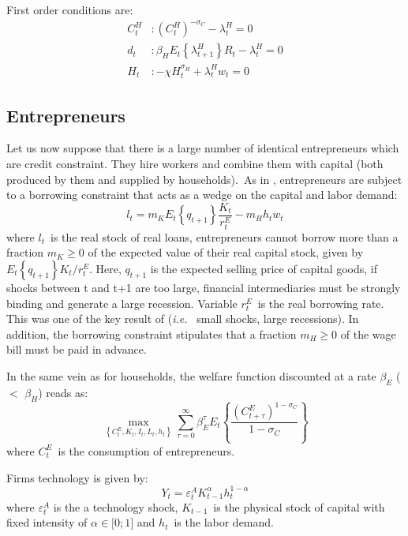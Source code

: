 \documentclass[a4paper,12pt]{article}%
\begin{document}
First order conditions are:%
\begin{align}
C_{t}^{H}  &  :\left(  C_{t}^{H}\right)  ^{-\sigma_{C}}-\lambda_{t}^{H}=0\\
d_{t}  &  :\beta_{H}E_{t}\left\{  \lambda_{t+1}^{H}\right\}  R_{t}-\lambda
_{t}^{H}=0\\
H_{t}  &  :-\chi H_{t}^{\sigma_{H}}+\lambda_{t}^{H}w_{t}=0
\end{align}


\subsection{Entrepreneurs}

Let us now suppose that there is a large number of identical entrepreneurs
which are credit constraint. They hire workers and combine them with capital
(both produced by them and supplied by households).\ As in
\cite{iacoviello2015financial}, entrepreneurs are subject to a borrowing
constraint that acts as a wedge on the capital and labor demand:
\begin{equation}
l_{t}=m_{K}E_{t}\left\{  q_{t+1}\right\}  \frac{K_{t}}{r_{t}^{E}}-m_{H}%
h_{t}w_{t}%
\end{equation}
where $l_{t}$\ is the real stock of real loans, entrepreneurs cannot borrow
more than a fraction $m_{K}\geq0$ of the expected value of their real capital
stock, given by $E_{t}\left\{  q_{t+1}\right\}  K_{t}/r_{t}^{E}$. Here,
$q_{t+1}$ is the expected selling price of capital goods, if shocks between t
and t+1 are too large, financial intermediaries must be strongly binding and
generate a large recession. Variable $r_{t}^{E}$\ is the real borrowing rate.
This was one of the key result of \cite{kiyotaki1997credit} (\textit{i.e.}%
\ small shocks, large recessions). In addition, the borrowing constraint
stipulates that a fraction $m_{H}\geq0$ of the wage bill must be paid in advance.

In the same vein as for households, the welfare function discounted at a rate
$\beta_{E}$ (%
$<$%
$\beta_{H}$) reads as:
\begin{equation}
\max_{\left\{  C_{t}^{E},K_{t},I_{t},L_{t},h_{t}\right\}  }\sum_{\tau
=0}^{\infty}\beta_{E}^{\tau}E_{t}\left\{  \frac{\left(  C_{t+\tau}^{E}\right)
^{1-\sigma_{C}}}{1-\sigma_{C}}\right\}
\end{equation}
where $C_{t}^{E}$\ is the consumption of entrepreneurs.

Firms technology is given by:%
\begin{equation}
Y_{t}=\varepsilon_{t}^{A}K_{t-1}^{\alpha}h_{t}^{1-\alpha}%
\end{equation}
where $\varepsilon_{t}^{A}$ is the a technology shock, $K_{t-1}$\ is the
physical stock of capital with fixed intensity of $\alpha\in\lbrack0;1]$ and
$h_{t}$\ is the labor demand.
\end{document}
